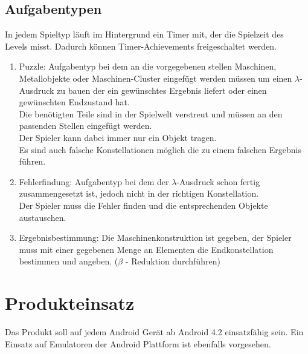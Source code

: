 \documentclass{scrartcl}
\begin{document}
\subsection{Aufgabentypen} \label{subsection:Aufgabentypen}
In jedem Spieltyp läuft im Hintergrund ein Timer mit, der die Spielzeit des Levels misst. Dadurch können Timer-Achievements freigeschaltet werden.
\begin{enumerate}
	\item \label{aufgabentyp:puzzle} Puzzle: Aufgabentyp bei dem an die vorgegebenen stellen Maschinen, Metallobjekte oder Maschinen-Cluster eingefügt werden müssen um einen $\lambda$-Ausdruck zu bauen der ein gewünschtes Ergebnis liefert oder einen gewünschten Endzustand hat.\\
	Die benötigten Teile sind in der Spielwelt verstreut und müssen an den passenden Stellen eingefügt werden.\\
	Der Spieler kann dabei immer nur ein Objekt tragen.\\
	Es sind auch falsche Konstellationen möglich die zu einem falschen Ergebnis führen.\\
	\item \label{aufgabentyp:fehlerfindung} Fehlerfindung: Aufgabentyp bei dem der $\lambda$-Ausdruck schon fertig zusammengesetzt ist, jedoch nicht in der richtigen Konstellation.\\
	Der Spieler muss die Fehler finden und die entsprechenden Objekte austauschen.\\
	\item \label{aufgabentyp:ergebnis} Ergebnisbestimmung: Die Maschinenkonstruktion ist gegeben, der Spieler muss mit einer gegebenen Menge an Elementen die Endkonstellation bestimmen und angeben. ($\beta$ - Reduktion durchführen) 
\end{enumerate}

\clearpage









\section{Produkteinsatz}

Das Produkt soll auf jedem Android Gerät ab Android 4.2 einsatzfähig sein. Ein Einsatz auf Emulatoren der Android Plattform ist ebenfalls vorgesehen.
\end{document}
